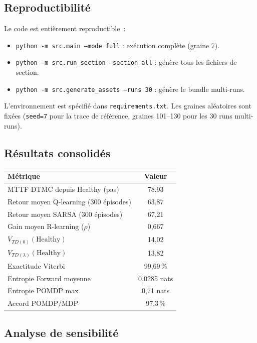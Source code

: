 \documentclass[12pt,a4paper]{article}
\begin{document}
\subsection{Reproductibilité}

Le code est entièrement reproductible~:
\begin{itemize}
  \item \texttt{python -m src.main --mode full} : exécution complète (graine 7).
  \item \texttt{python -m src.run\_section --section all} : génère tous les fichiers de section.
  \item \texttt{python -m src.generate\_assets --runs 30} : génère le bundle multi-runs.
\end{itemize}
L'environnement est spécifié dans \texttt{requirements.txt}.
Les graines aléatoires sont fixées (\texttt{seed=7} pour la trace de référence,
graines 101--130 pour les 30 runs multi-runs).

\subsection{Résultats consolidés}

\begin{center}
\begin{tabular}{lc}
\toprule
Métrique & Valeur \\
\midrule
MTTF DTMC depuis Healthy (pas) & 78,93 \\
Retour moyen Q-learning (300 épisodes) & 63,87 \\
Retour moyen SARSA (300 épisodes) & 67,21 \\
Gain moyen R-learning ($\rho$) & 0,667 \\
$V_{TD(0)}(\text{Healthy})$ & 14,02 \\
$V_{TD(\lambda)}(\text{Healthy})$ & 13,82 \\
Exactitude Viterbi & 99,69\,\% \\
Entropie Forward moyenne & 0,0285 nats \\
Entropie POMDP max & 0,71 nats \\
Accord POMDP/MDP & 97,3\,\% \\
\bottomrule
\end{tabular}
\end{center}

\subsection{Analyse de sensibilité}
\end{document}
